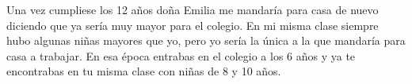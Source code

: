 \documentclass[12pt,a5paper]{book}
\begin{document}
Una vez cumpliese los 12 años doña Emilia me mandaría para casa de nuevo diciendo que ya sería muy mayor para el colegio. En mi misma clase siempre hubo algunas niñas mayores que yo, pero yo sería la única a la que mandaría para casa a trabajar. En esa época entrabas en el colegio a los 6 años y ya te encontrabas en tu misma clase con niñas de 8 y 10 años.


%
%
%
%
%
%
%
\end{document}
